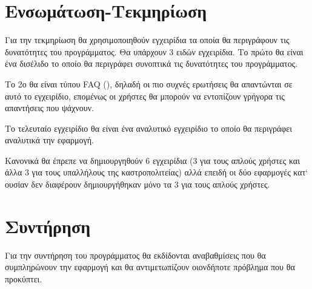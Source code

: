 \documentclass{assignment}
\begin{document}

\section{Ενσωμάτωση-Τεκμηρίωση}

Για την τεκμηρίωση θα χρησιμοποιηθούν εγχειρίδια τα οποία θα περιγράφουν τις δυνατότητες του προγράμματος. Θα υπάρχουν 3 ειδών εγχειρίδια. Το πρώτο θα είναι ένα δισέλιδο το οποίο θα περιγράφει συνοπτικά τις δυνατότητες του προγράμματος.

Το 2ο θα είναι τύπου FAQ (), δηλαδή οι πιο συχνές ερωτήσεις θα απαντώνται σε αυτό το εγχειρίδιο, επομένως οι χρήστες θα μπορούν να εντοπίζουν γρήγορα τις απαντήσεις που ψάχνουν.

Το τελευταίο εγχειρίδιο θα είναι ένα αναλυτικό εγχειρίδιο το οποίο θα περιγράφει αναλυτικά την εφαρμογή.

Κανονικά θα έπρεπε να δημιουργηθούν 6 εγχειρίδια (3 για τους απλούς χρήστες και άλλα 3 για τους υπαλλήλους της καστροπολιτείας) αλλά επειδή οι δύο εφαρμογές κατ` ουσίαν δεν διαφέρουν δημιουργήθηκαν μόνο τα 3 για τους απλούς χρήστες.


\section{Συντήρηση}

Για την συντήρηση του προγράμματος θα εκδίδονται αναβαθμίσεις που θα συμπληρώνουν την εφαρμογή και θα αντιμετωπίζουν οιονδήποτε πρόβλημα που θα προκύπτει.

 \label{Βιβλιογραφία}



\newpage
\end{document}
